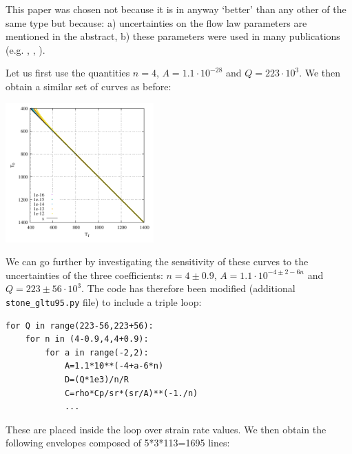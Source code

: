 This paper was chosen not because it is in anyway `better' than any other of the 
same type but because: a) uncertainties on the flow law parameters are 
mentioned in the abstract, b) these parameters were used in many publications 
(e.g. \cite{wabj08}, \cite{wabj08b}, \cite{wabj08c}).

Let us first use the quantities $n=4$, $A=1.1\cdot 10^{-28}$ and $Q=223\cdot 10^3$.
We then obtain a similar set of curves as before:

\begin{center}
\includegraphics[width=5.7cm]{python_codes/fieldstone_167/gltu95/fig6.pdf}
\end{center}

We can go further by investigating the sensitivity of these curves to 
the uncertainties of the three coefficients:
$n=4 \pm 0.9$, $A=1.1\cdot 10^{-4 \pm 2 -6n}$ and $Q=223 \pm 56 \cdot 10^3$.
The code has therefore been modified (additional \verb|stone_gltu95.py| file)
to include a triple loop:
\begin{lstlisting}
for Q in range(223-56,223+56):
    for n in (4-0.9,4,4+0.9):
        for a in range(-2,2):
            A=1.1*10**(-4+a-6*n)
            D=(Q*1e3)/n/R
            C=rho*Cp/sr*(sr/A)**(-1./n)
            ...
\end{lstlisting}
These are placed inside the loop over strain rate values. 
We then obtain the following envelopes composed of 5*3*113=1695 lines:

